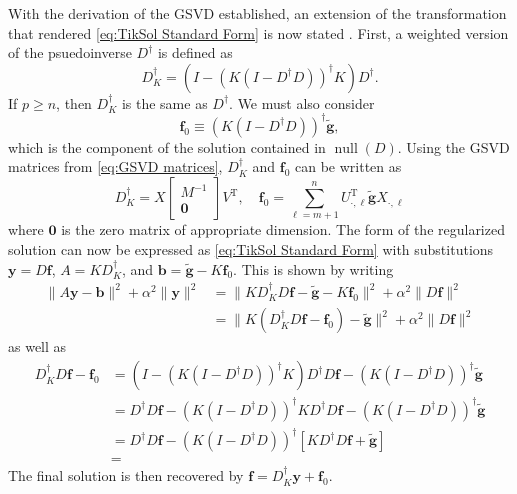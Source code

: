 \documentclass[12pt]{article}
\newcommand{\gnoiseVec}{\widetilde{\mathbf{g}}}	%
\newcommand{\kMat}{K}	%
\newcommand{\fVec}{\mathbf{f}}	%
\newcommand{\trans}{\mathrm{T}}	%
\newcommand{\nullspace}{\operatorname{null}}	%
\newcommand{\regparam}{\alpha}
\begin{document}
With the derivation of the GSVD established, an extension of the transformation that rendered \eqref{eq:TikSol Standard Form} is now stated \cite[p.~38]{Hansen:98}. First, a weighted version of the psuedoinverse $D^\dagger$ is defined as
\[D_{\kMat}^\dagger = \left(I - \left(\kMat\left(I - D^\dagger D\right)\right)^\dagger \kMat\right)D^\dagger.\]
If $p \geq n$, then $D_{\kMat}^\dagger$ is the same as $D^\dagger$. We must also consider
\[\fVec_0 \equiv \left(\kMat\left(I - D^\dagger D\right)\right)^\dagger \gnoiseVec,\]
which is the component of the solution contained in $\nullspace(D)$.  Using the GSVD matrices from \eqref{eq:GSVD matrices}, $D_{\kMat}^\dagger$ and $\fVec_0$ can be written as
\begin{equation}
\label{eq:Trans. 1}
D_{\kMat}^\dagger = X \begin{bmatrix}
M^{-1} \\
\mathbf{0}
\end{bmatrix}V^\trans, \quad \fVec_0 = \sum_{\ell=m+1}^{n} U_{\cdot,\ell}^\trans\gnoiseVec X_{\cdot,\ell}
\end{equation}
where $\bm{0}$ is the zero matrix of appropriate dimension. The form of the regularized solution can now be expressed as \eqref{eq:TikSol Standard Form} with substitutions $\mathbf{y} = D\fVec$, $A = \kMat{D_{\kMat}^\dagger}$, and $\mathbf{b} = \gnoiseVec - \kMat\fVec_0$. This is shown by writing
\begin{align*}
\|A\mathbf{y} - \mathbf{b}\|^2 + \regparam^2\|\mathbf{y}\|^2 &= \|\kMat{D_{\kMat}^\dagger}D\fVec - \gnoiseVec - \kMat\fVec_0\|^2 + \regparam^2\|D\fVec\|^2 \\
&=  \|\kMat({D_{\kMat}^\dagger}D\fVec - \fVec_0) - \gnoiseVec\|^2 + \regparam^2\|D\fVec\|^2
\end{align*}
as well as 
\begin{align*}
{D_{\kMat}^\dagger}D\fVec - \fVec_0 &= \left(I - \left(\kMat\left(I - D^\dagger D\right)\right)^\dagger \kMat\right)D^\dagger D\fVec - \left(\kMat\left(I - D^\dagger D\right)\right)^\dagger \gnoiseVec \\
&= D^\dagger D\fVec - \left(\kMat\left(I - D^\dagger D\right)\right)^\dagger \kMat D^\dagger D\fVec - \left(\kMat\left(I - D^\dagger D\right)\right)^\dagger \gnoiseVec \\ 
&= D^\dagger D\fVec - \left(\kMat\left(I - D^\dagger D\right)\right)^\dagger \left[\kMat D^\dagger D\fVec + \gnoiseVec\right] \\
&= 
\end{align*}
The final solution is then recovered by $\fVec = D_{\kMat}^\dagger \mathbf{y} + \fVec_0$. \newpage
\end{document}
